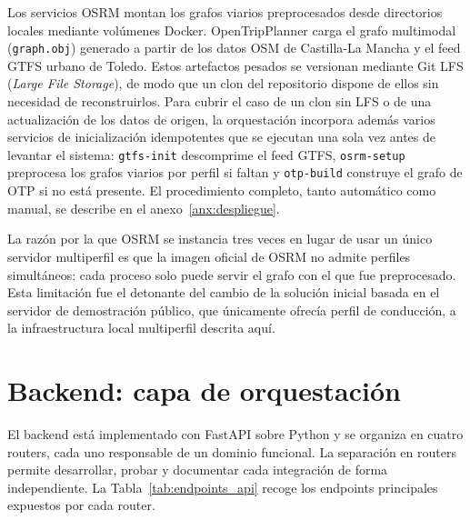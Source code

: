 Los servicios OSRM montan los grafos viarios preprocesados desde directorios locales mediante volúmenes Docker. OpenTripPlanner carga el grafo multimodal (\texttt{graph.obj}) generado a partir de los datos OSM de Castilla-La Mancha y el feed GTFS urbano de Toledo. Estos artefactos pesados se versionan mediante Git LFS (\textit{Large File Storage}), de modo que un clon del repositorio dispone de ellos sin necesidad de reconstruirlos. Para cubrir el caso de un clon sin LFS o de una actualización de los datos de origen, la orquestación incorpora además varios servicios de inicialización idempotentes que se ejecutan una sola vez antes de levantar el sistema: \texttt{gtfs-init} descomprime el feed GTFS, \texttt{osrm-setup} preprocesa los grafos viarios por perfil si faltan y \texttt{otp-build} construye el grafo de OTP si no está presente. El procedimiento completo, tanto automático como manual, se describe en el anexo~\ref{anx:despliegue}.

La razón por la que OSRM se instancia tres veces en lugar de usar un único servidor multiperfil es que la imagen oficial de OSRM no admite perfiles simultáneos: cada proceso solo puede servir el grafo con el que fue preprocesado. Esta limitación fue el detonante del cambio de la solución inicial basada en el servidor de demostración público, que únicamente ofrecía perfil de conducción, a la infraestructura local multiperfil descrita aquí.

\section{Backend: capa de orquestación}
\label{sec:arch_backend}

El backend está implementado con FastAPI sobre Python y se organiza en cuatro routers, cada uno responsable de un dominio funcional. La separación en routers permite desarrollar, probar y documentar cada integración de forma independiente. La Tabla~\ref{tab:endpoints_api} recoge los endpoints principales expuestos por cada router.

